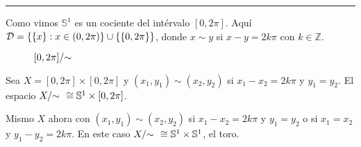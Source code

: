 \hrule
\begin{example}
    Como vimos \(\mathbb{S}^1\) es un cociente del intérvalo \([0,2\pi]\). Aquí \(\mathcal{D} = \{\{x\}: x\in (0,2\pi)\}\cup \{\{0,2\pi\}\}\), donde \(x\sim y\) si \(x-y = 2k\pi\) con \(k\in \mathbb{Z}\). 
    \begin{figure}[!h]
    \centering
    \begin{subfigure}{0.4\textwidth}
        \centering
    \end{subfigure}
    \begin{subfigure}{0.4\textwidth}
        \centering
    \end{subfigure}
    
    \caption{\([0,2\pi]/\hspace{-0.1cm} \sim \)}
\end{figure}
\end{example}
\begin{example}
    Sea \(X = [0,2\pi]\times [0,2\pi]\) y \( (x_1,y_1)\sim (x_2,y_2)\) si \(x_1-x_2 = 2k\pi\) y \(y_1 = y_2\). El espacio \(X/\hspace{-0.1cm} \sim \ \ \cong \mathbb{S}^1\times [0,2\pi]\). 
\end{example}
\begin{example}
    Mismo \(X\) ahora con \( (x_1,y_1)\sim (x_2,y_2)\) si \(x_1-x_2 = 2k\pi\) y \(y_1 = y_2\) o si \(x_1=x_2\) y \(y_1-y_2 = 2k\pi\). En este caso \(X/\hspace{-0.1cm} \sim \ \ \cong \mathbb{S}^1\times \mathbb{S}^1\), el toro.  
\end{example}
